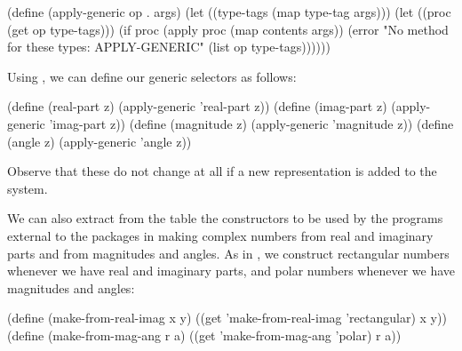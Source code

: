 \begin{codeBlock}
(define (apply-generic op . args)
  (let ((type-tags (map type-tag args)))
    (let ((proc (get op type-tags)))
      (if proc
          (apply proc (map contents args))
          (error
            "No method for these types: APPLY-GENERIC"
            (list op type-tags))))))
\end{codeBlock}

\noindent
Using , we can define our generic selectors as follows:

\begin{codeBlock}
(define (real-part z) (apply-generic 'real-part z))
(define (imag-part z) (apply-generic 'imag-part z))
(define (magnitude z) (apply-generic 'magnitude z))
(define (angle z) (apply-generic 'angle z))
\end{codeBlock}

\noindent
Observe that these do not change at all if a new representation is added to the
system.

We can also extract from the table the constructors to be used by the programs
external to the packages in making complex numbers from real and imaginary
parts and from magnitudes and angles.  As in , we construct
rectangular numbers whenever we have real and imaginary parts, and polar
numbers whenever we have magnitudes and angles:

\begin{codeBlock}
(define (make-from-real-imag x y)
  ((get 'make-from-real-imag 'rectangular) x y))
(define (make-from-mag-ang r a)
  ((get 'make-from-mag-ang 'polar) r a))
\end{codeBlock}


